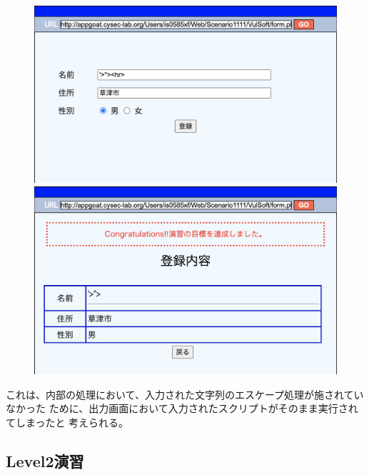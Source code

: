 \documentclass[dvipdfmx,autodetect-engine,titlepage]{jsarticle}
\begin{document}
\begin{figure}[h]
  \centering
  \begin{minipage}[b]{0.45\linewidth}
  \begin{center}
    \includegraphics[keepaspectratio,scale=0.34]{pic1.png}
    \end{center}
    \caption{}
  \end{minipage}
  \begin{minipage}[b]{0.45\linewidth}
  \begin{center}
    \includegraphics[keepaspectratio,scale=0.33]{pic2.png}
    \end{center}
    \caption{}
  \end{minipage}
\end{figure}

これは、内部の処理において、入力された文字列のエスケープ処理が施されていなかった
ために、出力画面において入力されたスクリプトがそのまま実行されてしまったと
考えられる。\\

\subsection{Level2演習}
\end{document}

